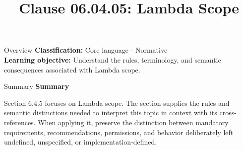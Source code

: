 \documentclass[10pt,letterpaper]{article}
\title{Clause 06.04.05: Lambda Scope}
\author{}
\date{}
\begin{document}
\maketitle
\begin{CornellOverviewBox}{Overview}
\textbf{Classification:} Core language - Normative\\[2pt]
\textbf{Learning objective:} Understand the rules, terminology, and semantic consequences associated with Lambda scope.
\end{CornellOverviewBox}\begin{CornellSummaryBox}{Summary}
{\sffamily\bfseries\color{Accent} Summary}\par\vspace{3pt}Section 6.4.5 focuses on Lambda scope. The section supplies the rules and semantic distinctions needed to interpret this topic in context with its cross-references. When applying it, preserve the distinction between mandatory requirements, recommendations, permissions, and behavior deliberately left undefined, unspecified, or implementation-defined.
\end{CornellSummaryBox}
\end{document}
